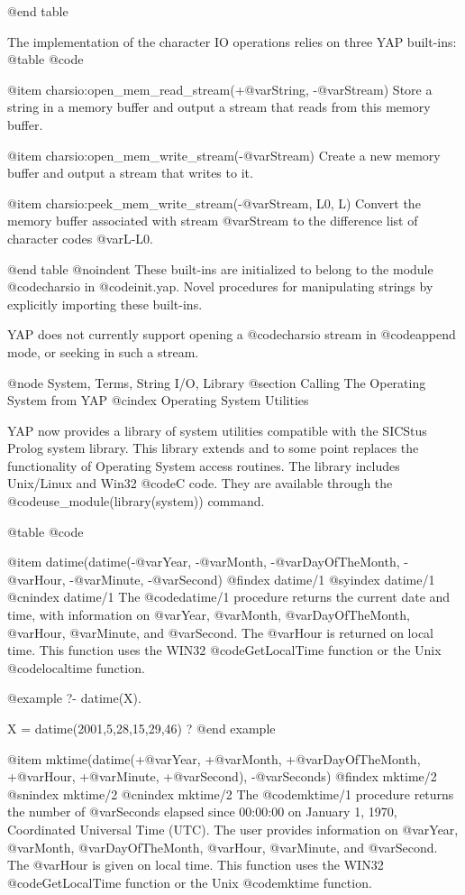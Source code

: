 {{{{{{{{{@end table

The implementation of the character IO operations relies on three YAP
built-ins:
@table @code

@item charsio:open_mem_read_stream(+@var{String}, -@var{Stream})
Store a string in a memory buffer and output a stream that reads from this
memory buffer.

@item charsio:open_mem_write_stream(-@var{Stream})
Create a new memory buffer and output a stream that writes to  it.

@item charsio:peek_mem_write_stream(-@var{Stream}, L0, L)
Convert the memory buffer associated with stream @var{Stream} to the
difference list of character codes @var{L-L0}.

@end table
@noindent
These built-ins are initialized to belong to the module @code{charsio} in
@code{init.yap}. Novel procedures for manipulating strings by explicitly
importing these built-ins.

YAP does not currently support opening a @code{charsio} stream in
@code{append} mode, or seeking in such a stream.

@node System, Terms, String I/O, Library
@section Calling The Operating System from YAP
@cindex Operating System Utilities

YAP now provides a library of system utilities compatible with the
SICStus Prolog system library. This library extends and to some point
replaces the functionality of Operating System access routines. The
library includes Unix/Linux and Win32 @code{C} code. They
are available through the @code{use_module(library(system))} command.

@table @code

@item datime(datime(-@var{Year}, -@var{Month}, -@var{DayOfTheMonth},
-@var{Hour}, -@var{Minute}, -@var{Second})
@findex  datime/1
@syindex datime/1
@cnindex datime/1
The @code{datime/1} procedure returns the current date and time, with
information on @var{Year}, @var{Month}, @var{DayOfTheMonth},
@var{Hour}, @var{Minute}, and @var{Second}. The @var{Hour} is returned
on local time. This function uses the WIN32
@code{GetLocalTime} function or the Unix @code{localtime} function.

@example
   ?- datime(X).

X = datime(2001,5,28,15,29,46) ? 
@end example

@item mktime(datime(+@var{Year}, +@var{Month}, +@var{DayOfTheMonth},
+@var{Hour}, +@var{Minute}, +@var{Second}), -@var{Seconds})
@findex  mktime/2
@snindex mktime/2
@cnindex mktime/2
The @code{mktime/1} procedure returns the number of @var{Seconds}
elapsed since 00:00:00 on January 1, 1970, Coordinated Universal Time
(UTC).  The user provides information on @var{Year}, @var{Month},
@var{DayOfTheMonth}, @var{Hour}, @var{Minute}, and @var{Second}. The
@var{Hour} is given on local time. This function uses the WIN32
@code{GetLocalTime} function or the Unix @code{mktime} function.

}}}}}}}}}
